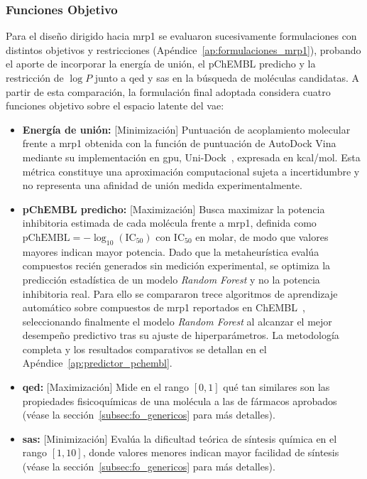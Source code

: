 \subsubsection{Funciones Objetivo}
\label{subsec:fo_mrp1}

Para el diseño dirigido hacia \gls{mrp1} se evaluaron sucesivamente formulaciones con distintos objetivos y restricciones (Apéndice~\ref{ap:formulaciones_mrp1}), probando el aporte de incorporar la energía de unión, el pChEMBL predicho y la restricción de $\log P$ junto a \gls{qed} y \gls{sas} en la búsqueda de moléculas candidatas. A partir de esta comparación, la formulación final adoptada considera cuatro funciones objetivo sobre el espacio latente del \gls{vae}:

\begin{itemize}
    \item \textbf{Energía de unión:} [Minimización] Puntuación de acoplamiento molecular frente a \gls{mrp1} obtenida con la función de puntuación de AutoDock Vina~\cite{trott2010vina} mediante su implementación en \gls{gpu}, Uni-Dock~\cite{yu2023unidock}, expresada en kcal/mol. Esta métrica constituye una aproximación computacional sujeta a incertidumbre y no representa una afinidad de unión medida experimentalmente.
    \item \textbf{pChEMBL predicho:} [Maximización] Busca maximizar la potencia inhibitoria estimada de cada molécula frente a \gls{mrp1}, definida como $\text{pChEMBL} = -\log_{10}(\text{IC}_{50})$ con $\text{IC}_{50}$ en molar, de modo que valores mayores indican mayor potencia. Dado que la metaheurística evalúa compuestos recién generados sin medición experimental, se optimiza la predicción estadística de un modelo \textit{Random Forest} y no la potencia inhibitoria real. Para ello se compararon trece algoritmos de aprendizaje automático sobre compuestos de \gls{mrp1} reportados en ChEMBL~\cite{mendez2019chembl}, seleccionando finalmente el modelo \textit{Random Forest} al alcanzar el mejor desempeño predictivo tras su ajuste de hiperparámetros. La metodología completa y los resultados comparativos se detallan en el Apéndice~\ref{ap:predictor_pchembl}.
    \item \textbf{\gls{qed}:} [Maximización] Mide en el rango $[0, 1]$ qué tan similares son las propiedades fisicoquímicas de una molécula a las de fármacos aprobados (véase la sección~\ref{subsec:fo_genericos} para más detalles).
    \item \textbf{\gls{sas}:} [Minimización] Evalúa la dificultad teórica de síntesis química en el rango $[1, 10]$, donde valores menores indican mayor facilidad de síntesis (véase la sección~\ref{subsec:fo_genericos} para más detalles).
\end{itemize}

